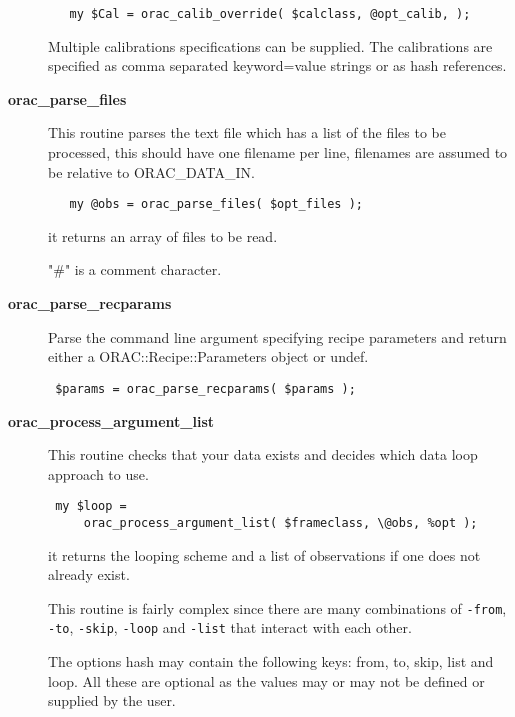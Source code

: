 \begin{description}
\begin{verbatim}
   my $Cal = orac_calib_override( $calclass, @opt_calib, );
\end{verbatim}


Multiple calibrations specifications can be supplied.
The calibrations are specified as comma separated keyword=value strings
or as hash references.


\item[{\textbf{orac\_parse\_files}}] \mbox{}

This routine parses the text file which has a list of the files to be
processed, this should have one filename per line, filenames are
assumed to be relative to ORAC\_DATA\_IN.

\begin{verbatim}
   my @obs = orac_parse_files( $opt_files );
\end{verbatim}


it returns an array of files to be read.



"\#" is a comment character.


\item[{\textbf{orac\_parse\_recparams}}] \mbox{}

Parse the command line argument specifying recipe parameters and return
either a ORAC::Recipe::Parameters object or undef.

\begin{verbatim}
 $params = orac_parse_recparams( $params );
\end{verbatim}

\item[{\textbf{orac\_process\_argument\_list}}] \mbox{}

This routine checks that your data exists and decides which data
loop approach to use.

\begin{verbatim}
 my $loop =
     orac_process_argument_list( $frameclass, \@obs, %opt );
\end{verbatim}


it returns the looping scheme and a list of observations if one does not
already exist.



This routine is fairly complex since there are many combinations of
\texttt{-from}, \texttt{-to}, \texttt{-skip}, \texttt{-loop} and \texttt{-list} that interact with
each other.



The options hash may contain the following keys: from, to, skip,
list and loop. All these are optional as the values may or may
not be defined or supplied by the user.



\end{description}
